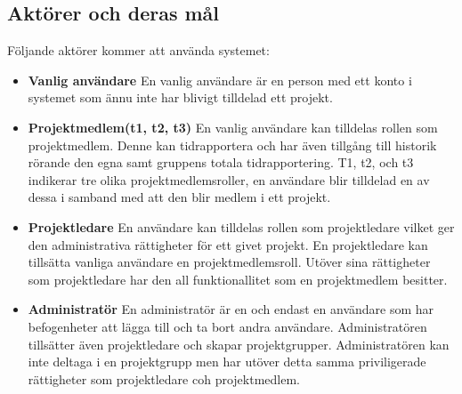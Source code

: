 \documentclass[a4paper]{article}
\begin{document}
\subsection{Aktörer och deras mål}
\label{bom-aktorer}
Följande aktörer kommer att använda systemet:
\begin{itemize}
\item [] \textbf{Vanlig användare} En vanlig användare är en person med ett konto i systemet som ännu inte har blivigt tilldelad ett projekt.
\item [] \textbf{Projektmedlem(t1, t2, t3)} En vanlig användare kan tilldelas rollen som projektmedlem. Denne kan tidrapportera och har även tillgång till historik rörande den egna samt gruppens totala tidrapportering. T1, t2, och t3 indikerar tre olika projektmedlemsroller, en användare blir tilldelad en av dessa i samband med att den blir medlem i ett projekt.
\item [] \textbf{Projektledare} En användare kan tilldelas rollen som projektledare vilket ger den administrativa rättigheter för ett givet projekt. En projektledare kan tillsätta vanliga användare en projektmedlemsroll. Utöver sina rättigheter som projektledare har den all funktionallitet som en projektmedlem besitter.
\item [] \textbf{Administratör} En administratör är en och endast en användare som har befogenheter att lägga till och ta bort andra användare. Administratören tillsätter även projektledare och skapar projektgrupper. Administratören kan inte deltaga i en projektgrupp men har utöver detta samma priviligerade rättigheter som projektledare coh projektmedlem.
\end{itemize}
\end{document}
